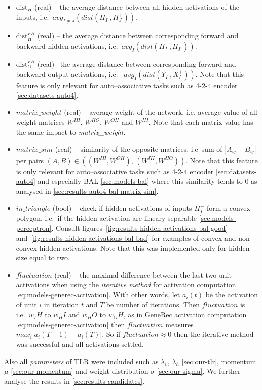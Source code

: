 \begin{itemize} 
\item $\mbox{dist}_{H}$ (real) -- the average distance between all hidden activations of the inputs, i.e.~$avg_{I \neq J}\left(dist(H_I^{+},H_J^{+})\right)$.

\label{sec:our-dist-h-fb}
\item $\mbox{dist}_{H}^{FB}$ (real) -- the average distance between corresponding forward and backward hidden activations, i.e.~$avg_{I}\left(dist(H_I^{-},H_I^{+})\right)$.

\item	$\mbox{dist}_{O}^{FB}$ (real)-- the average distance between corresponding forward and backward output activations, i.e.~  $avg_{I}\left(dist(Y_I^{-},X_I^{+})\right)$. Note that this feature is only relevant for auto--associative tasks such as 4-2-4 encoder \ref{sec:datasets-auto4}. 

\item $matrix\_weight$ (real) -- average weight of the network, i.e. average value of all weight matrices $W^{IH}$, $W^{HO}$, $W^{OH}$ and $W^{HI}$. Note that each matrix value has the same impact to \emph{matrix\_weight}. 

\item $matrix\_sim$ (real) -- similarity of the opposite matrices, i.e~sum of $|A_{ij} - B_{ij}|$ per pairs $(A,B) \in ((W^{IH}, W^{OH}),\, (W^{HI}, W^{HO}))$. Note that this feature is only relevant for auto--associative tasks such as 4-2-4 encoder \ref{sec:datasets-auto4} and especially BAL \ref{sec:models-bal} where this similarity tends to 0 as analysed in \ref{sec:results-auto4-bal-matrix-sim}. 

\label{sec:our-in-triangle}
\item $in\_triangle$ (bool) -- check if hidden activations of inputs  $H_I^{+}$ form a convex polygon, i.e.~if the hidden activation are lineary separable \ref{sec:models-perceptron}. Consult figures~\ref{fig:results-hidden-activations-bal-good} and~\ref{fig:results-hidden-activations-bal-bad} for examples of convex and non--convex hidden activations. Note that this was implemented only for hidden size equal to two. 

\label{eq:our-fluctuation}
\item $fluctuation$ (real) -- the maximal difference between the last two unit activations when using the \emph{iterative method} for activation computation \ref{eq:models-generec-activation}. With other words, let $a_i(t)$ be the activation of unit $i$ in iteration $t$ and $T$ be number of iterations. Then $fluctuation$ is i.e.~$w_IH$ to $w_HI$ and $w_HO$ to $w_OH$, as in GeneRec activation computation \ref{eq:models-generec-activation} then $fluctuation$ measures $max_i|a_i(T-1) - a_i(T)|$. So if $fluctuation \approx 0$ then the iterative method was successful and all activations settled.
\end{itemize} 

Also all \emph{parameters} of TLR were included such as $\lambda_v$, $\lambda_h$ \ref{sec:our-tlr}, momentum $\mu$ \ref{sec:our-momentum} and weight distribution $\sigma$ \ref{sec:our-sigma}. We further analyse the results in \ref{sec:results-candidates}. 
